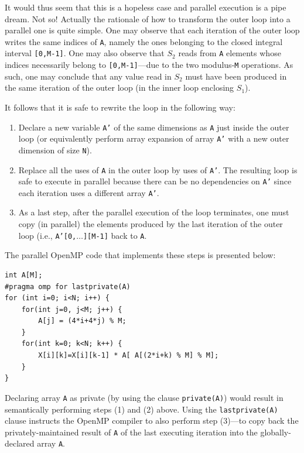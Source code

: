 It would thus seem that this is a hopeless case and parallel
execution is a pipe dream. Not so! Actually the rationale
of how to transform the outer loop into a parallel one
is quite simple.  One may observe that each iteration of
the outer loop writes the same indices of \texttt{A}, namely
the ones belonging to the closed integral interval
\texttt{[0,M-1]}.   One may also observe that $S_2$ reads
from \texttt{A} elements whose indices necessarily belong to
\texttt{[0,M-1]}---due to the two modulus-\texttt{M} operations.
As such, one may conclude that any value
read in $S_2$ must have been produced in the same iteration
of the outer loop (in the inner loop enclosing $S_1$).

It follows that it is safe to rewrite the loop in the
following way:
\begin{enumerate}
\item Declare a new variable \texttt{A'} of the same dimensions as
  \texttt{A} just inside the outer loop (or equivalently perform array
  expansion of array \texttt{A'} with a new outer dimension of size
  \texttt{N}).
\item Replace all the uses of \texttt{A} in the outer loop by uses of
  \texttt{A'}.  The resulting loop is safe to execute in parallel
  because there can be no dependencies on \texttt{A'} since each
  iteration uses a different array \texttt{A'}.
\item As a last step, after the parallel execution of the loop
  terminates, one must copy (in parallel) the elements produced by the
  last iteration of the outer loop (i.e., \texttt{A'[0,$\ldots$][M-1]}
  back to \texttt{A}.
\end{enumerate}

The parallel OpenMP code that implements these steps is
presented below:

\begin{lstlisting}[mathescape=true]
int A[M];
#pragma omp for lastprivate(A)
for (int i=0; i<N; i++) {
    for(int j=0, j<M; j++) {
        A[j] = (4*i+4*j) % M;
    }
    for(int k=0; k<N; k++) {
        X[i][k]=X[i][k-1] * A[ A[(2*i+k) % M] % M];
    }
}
\end{lstlisting}

Declaring array \texttt{A} as private (by using the clause
\texttt{private(A)}) would result in semantically performing steps (1)
and (2) above. Using the \texttt{lastprivate(A)} clause instructs the
OpenMP compiler to also perform step (3)---to copy back the
privately-maintained result of \texttt{A} of the last executing
iteration into the globally-declared array \texttt{A}.

